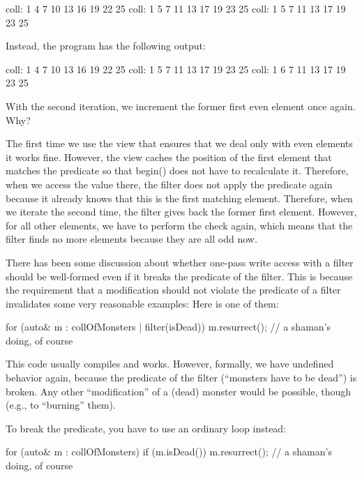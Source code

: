 \begin{shell}
coll: 1 4 7 10 13 16 19 22 25
coll: 1 5 7 11 13 17 19 23 25
coll: 1 5 7 11 13 17 19 23 25
\end{shell}

Instead, the program has the following output:

\begin{shell}
coll: 1 4 7 10 13 16 19 22 25
coll: 1 5 7 11 13 17 19 23 25
coll: 1 6 7 11 13 17 19 23 25
\end{shell}

With the second iteration, we increment the former first even element once again. Why?

The first time we use the view that ensures that we deal only with even elements it works fine. However, the view caches the position of the first element that matches the predicate so that begin() does not have to recalculate it. Therefore, when we access the value there, the filter does not apply the predicate again because it already knows that this is the first matching element. Therefore, when we iterate the second time, the filter gives back the former first element. However, for all other elements, we have to perform the check again, which means that the filter finds no more elements because they are all odd now.

There has been some discussion about whether one-pass write access with a filter should be well-formed even if it breaks the predicate of the filter. This is because the requirement that a modification should not violate the predicate of a filter invalidates some very reasonable examples: Here is one of them:

\begin{cpp}
for (auto& m : collOfMonsters | filter(isDead)) {
	m.resurrect(); // a shaman’s doing, of course
}
\end{cpp}

This code usually compiles and works. However, formally, we have undefined behavior again, because the predicate of the filter (“monsters have to be dead”) is broken. Any other “modification” of a (dead) monster would be possible, though (e.g., to “burning” them).

To break the predicate, you have to use an ordinary loop instead:

\begin{cpp}
for (auto& m : collOfMonsters) {
	if (m.isDead()) {
		m.resurrect(); // a shaman’s doing, of course
	}
}
\end{cpp}

